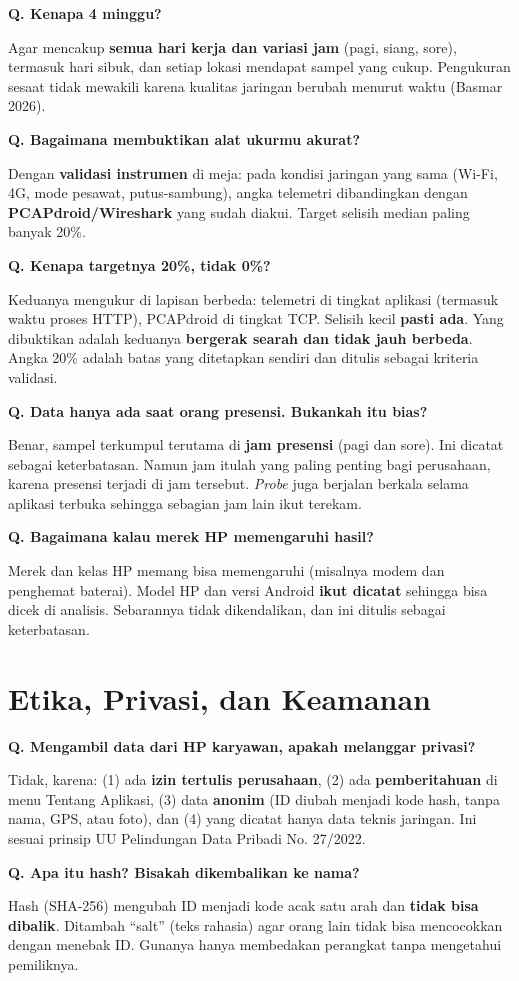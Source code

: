 \documentclass[11pt,a4paper]{article}
\newcounter{q}
\newcommand{\tanya}[2]{\stepcounter{q}%
\par\vspace{6pt}\noindent\colorbox{band}{\parbox{\dimexpr\linewidth-2\fboxsep}{\textbf{Q\arabic{q}. #1}}}\par\vspace{2pt}#2\par}
\begin{document}
\tanya{Kenapa 4 minggu?}{Agar mencakup \textbf{semua hari kerja dan variasi jam} (pagi, siang, sore), termasuk hari sibuk, dan setiap lokasi mendapat sampel yang cukup. Pengukuran sesaat tidak mewakili karena kualitas jaringan berubah menurut waktu (Basmar 2026).}

\tanya{Bagaimana membuktikan alat ukurmu akurat?}{Dengan \textbf{validasi instrumen} di meja: pada kondisi jaringan yang sama (Wi-Fi, 4G, mode pesawat, putus-sambung), angka telemetri dibandingkan dengan \textbf{PCAPdroid/Wireshark} yang sudah diakui. Target selisih median paling banyak 20\%.}

\tanya{Kenapa targetnya 20\%, tidak 0\%?}{Keduanya mengukur di lapisan berbeda: telemetri di tingkat aplikasi (termasuk waktu proses HTTP), PCAPdroid di tingkat TCP. Selisih kecil \textbf{pasti ada}. Yang dibuktikan adalah keduanya \textbf{bergerak searah dan tidak jauh berbeda}. Angka 20\% adalah batas yang ditetapkan sendiri dan ditulis sebagai kriteria validasi.}

\tanya{Data hanya ada saat orang presensi. Bukankah itu bias?}{Benar, sampel terkumpul terutama di \textbf{jam presensi} (pagi dan sore). Ini dicatat sebagai keterbatasan. Namun jam itulah yang paling penting bagi perusahaan, karena presensi terjadi di jam tersebut. \textit{Probe} juga berjalan berkala selama aplikasi terbuka sehingga sebagian jam lain ikut terekam.}

\tanya{Bagaimana kalau merek HP memengaruhi hasil?}{Merek dan kelas HP memang bisa memengaruhi (misalnya modem dan penghemat baterai). Model HP dan versi Android \textbf{ikut dicatat} sehingga bisa dicek di analisis. Sebarannya tidak dikendalikan, dan ini ditulis sebagai keterbatasan.}

\section{Etika, Privasi, dan Keamanan}

\tanya{Mengambil data dari HP karyawan, apakah melanggar privasi?}{Tidak, karena: (1) ada \textbf{izin tertulis perusahaan}, (2) ada \textbf{pemberitahuan} di menu Tentang Aplikasi, (3) data \textbf{anonim} (ID diubah menjadi kode hash, tanpa nama, GPS, atau foto), dan (4) yang dicatat hanya data teknis jaringan. Ini sesuai prinsip UU Pelindungan Data Pribadi No. 27/2022.}

\tanya{Apa itu hash? Bisakah dikembalikan ke nama?}{Hash (SHA-256) mengubah ID menjadi kode acak satu arah dan \textbf{tidak bisa dibalik}. Ditambah ``salt'' (teks rahasia) agar orang lain tidak bisa mencocokkan dengan menebak ID. Gunanya hanya membedakan perangkat tanpa mengetahui pemiliknya.}
\end{document}
